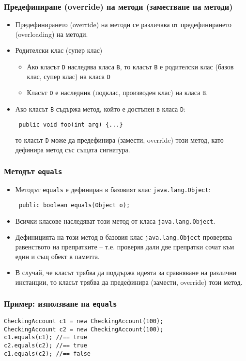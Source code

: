 \documentclass[ignorenonframetext, hyperref=unicode,compress]{beamer}
\begin{document}
\begin{frame}[containsverbatim]\frametitle{Предефиниране (override) на методи (заместване на методи)}
\begin{itemize}
 \item Предефинирането (override) на методи се различава от предефинирането (overloading) на методи.
 \item Родителски клас (супер клас)
 \begin{itemize}
 \item Ако класът \lstinline{D} наследява класа \lstinline{B}, то класът \lstinline{B} е родителски клас (базов клас, супер клас) на класа \lstinline{D}
 \item Класът \lstinline{D} е наследник (подклас, производен клас) на класа \lstinline{B}.
 \end{itemize}
 \item Ако класът \lstinline{B} съдържа метод, който е достъпен в класа \lstinline{D}:
\begin{lstlisting}
 public void foo(int arg) {...}
\end{lstlisting}
 то класът \lstinline{D} може да предефинира (замести, override) този метод, като дефинира метод със същата сигнатура.
\end{itemize}
\end{frame}

\begin{frame}[containsverbatim]\frametitle{Методът \lstinline{equals}}
\begin{itemize}
 \item Методът \lstinline{equals} е дефиниран в базовият клас \lstinline{java.lang.Object}:
\begin{lstlisting}
 public boolean equals(Object o);
\end{lstlisting}
 \item Всички класове наследяват този метод от класа \lstinline{java.lang.Object}.
 \item Дефиницията на този метод в базовия клас \lstinline{java.lang.Object} проверява равенството на препратките -- т.е. проверяв дали две препратки сочат към един и същ обект в паметта.
 \item В случай, че класът трябва да поддържа идеята за сравняване на различни инстанции, то класът трябва да предефинира (замести, override) този метод.
\end{itemize}
\end{frame}

\begin{frame}[containsverbatim]\frametitle{Пример: използване на \lstinline{equals}}
\begin{lstlisting}
CheckingAccount c1 = new CheckingAccount(100);
CheckingAccount c2 = new CheckingAccount(100);
c1.equals(c1); //== true
c2.equals(c2); //== true
c1.equals(c2); //== false
\end{lstlisting}
\end{frame}
\end{document}
